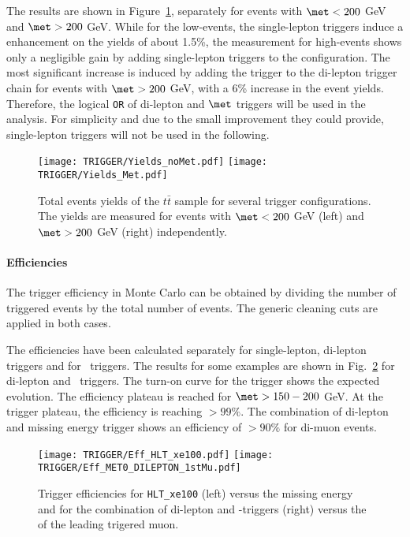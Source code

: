 The results are shown in Figure~\ref{fig:triggerYields}, separately  for events with $\met < 200$ GeV and 	$\met > 200$ GeV. While for the low-\met events, the single-lepton triggers induce a enhancement on the yields of about 1.5\%, the measurement for high-\met events shows only a negligible gain by adding single-lepton triggers to the configuration. The most significant increase is induced by adding the \met trigger to the di-lepton trigger chain for events with $\met > 200$ GeV, with a 6\% increase in the event yields. 
Therefore, the logical \texttt{OR} of di-lepton and $\met$ triggers will be used in the analysis.
For simplicity and due to the small improvement they could provide, single-lepton triggers will not be used in the following. 

\begin{figure}[htb!]
\centering
\texttt{[image: TRIGGER/Yields\_noMet.pdf]}
\texttt{[image: TRIGGER/Yields\_Met.pdf]}
\caption{Total events yields of the $t\bar{t}$ sample for several trigger configurations. The yields are measured for events with $\met < 200$ GeV (left) and $\met > 200$ GeV (right) independently.}
\label{fig:triggerYields}
\end{figure}

\paragraph{Efficiencies}

The trigger efficiency in Monte Carlo can be obtained by dividing the number of triggered events by the total number of events. The generic cleaning cuts are applied in both cases. 


The efficiencies have been calculated separately for single-lepton, di-lepton triggers and for \met\ triggers. 
The results for some examples are shown in Fig.~\ref{fig:triggerEff} for di-lepton and \met\ triggers. 
The turn-on curve for the \met trigger shows the expected evolution. 
The efficiency plateau is reached for $\met > 150-200$ GeV. At the trigger plateau, the efficiency is reaching $>99\%$. 
The combination of di-lepton and missing energy trigger shows an efficiency of $>90\%$ for di-muon events.

\begin{figure}[htb!]
\centering
\texttt{[image: TRIGGER/Eff\_HLT\_xe100.pdf]}
\texttt{[image: TRIGGER/Eff\_MET0\_DILEPTON\_1stMu.pdf]}
\caption{Trigger efficiencies for \texttt{HLT\_xe100} (left) versus the missing energy and for the combination of di-lepton and \met-triggers (right) versus the \pt of the leading trigered muon.}
\label{fig:triggerEff}
\end{figure}



